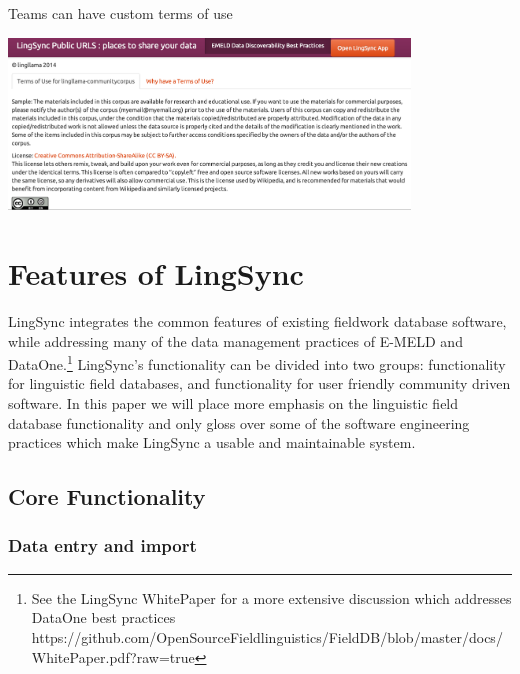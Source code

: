 \documentclass[letterpaper, 12pt, dvips]{mitwpl}
\begin{document}
\begin{exe} 
\ex Teams can have custom terms of use

 \centering
   \includegraphics[width=0.8\textwidth]{customtermsOfUse}

\label{ex:customtermsOfUse}
\end{exe}






\section{Features of LingSync}
\label{sec:what}

LingSync integrates the common features of existing fieldwork database software,
while addressing many of the data management practices of E-MELD and DataOne.\footnote{See the LingSync WhitePaper for a more extensive discussion which addresses DataOne best practices\\ https://github.com/OpenSourceFieldlinguistics/FieldDB/blob/master/docs/WhitePaper.pdf?raw=true}
LingSync's functionality can be divided into two groups: functionality for linguistic field databases,
and functionality for user friendly community driven software.
In this paper we will place more emphasis on the linguistic field database functionality and only gloss over some of the software engineering practices which make LingSync a usable and maintainable system. 

\subsection{Core Functionality}
\label{sec:core}
\subsubsection{Data entry and import}
\end{document}
